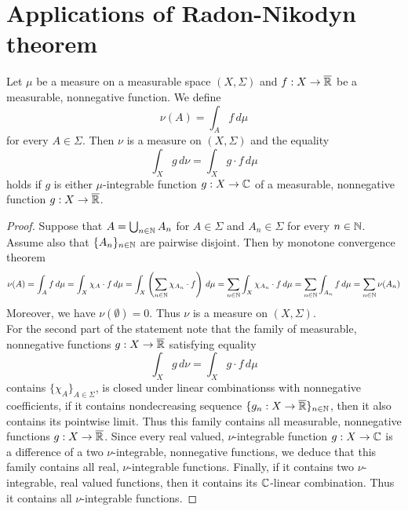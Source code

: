 \section{Applications of Radon-Nikodyn theorem}

\begin{proposition}\label{proposition:derivativeandintegration}
Let $\mu$ be a measure on a measurable space $(X,\Sigma)$ and $f:X\rightarrow \overline{{\mathbb R}}$ be a measurable, nonnegative function. We define
$$\nu(A) = \int_Af\,d\mu$$
for every $A\in \Sigma$. Then $\nu$ is a measure on $(X,\Sigma)$ and the equality
$$\int_X g\,d\nu =\int_Xg\cdot f\,d\mu$$
holds if $g$ is either $\mu$-integrable function $g:X\rightarrow {\mathbb C}$ of a measurable, nonnegative function $g:X\rightarrow \overline{{\mathbb R}}$.
\end{proposition}
\begin{proof}
Suppose that $A = \bigcup_{n\in {\mathbb N}}A_n$ for $A\in \Sigma$ and $A_n\in \Sigma$ for every $n\in {\mathbb N}$. Assume also that $\{A_n\}_{n\in {\mathbb N}}$ are pairwise disjoint. Then by monotone convergence theorem
$$\nu(A) = \int_A f\,d\mu = \int_X\chi_A\cdot f\,d\mu = \int_X\left(\sum_{n\in {\mathbb N}}\chi_{A_n}\cdot f\right)\,d\mu = \sum_{n\in {\mathbb N}}\int_X\chi_{A_n}\cdot f\,d\mu = \sum_{n\in {\mathbb N}}\int_{A_n}f\,d\mu = \sum_{n\in {\mathbb N}}\nu(A_n)$$
Moreover, we have $\nu(\emptyset) = 0$. Thus $\nu$ is a measure on $(X,\Sigma)$.\\
For the second part of the statement note that the family of measurable, nonnegative functions $g:X\rightarrow \overline{{\mathbb R}}$ satisfying equality
$$\int_Xg\,d\nu = \int_Xg\cdot f\,d\mu$$
contains $\{\chi_A\}_{A\in \Sigma}$, is closed under linear combinationss with nonnegative coefficients, if it contains nondecreasing sequence $\{g_n:X\rightarrow \overline{{\mathbb R}}\}_{n\in {\mathbb N}}$, then it also contains its pointwise limit. Thus this family contains all measurable, nonnegative functions $g:X\rightarrow \overline{{\mathbb R}}$. Since every real valued, $\nu$-integrable function $g:X\rightarrow {\mathbb C}$ is a difference of a two $\nu$-integrable, nonnegative functions, we deduce that this family contains all real, $\nu$-integrable functions. Finally, if it contains two $\nu$-integrable, real valued functions, then it contains its ${\mathbb C}$-linear combination. Thus it contains all $\nu$-integrable functions.
\end{proof}

